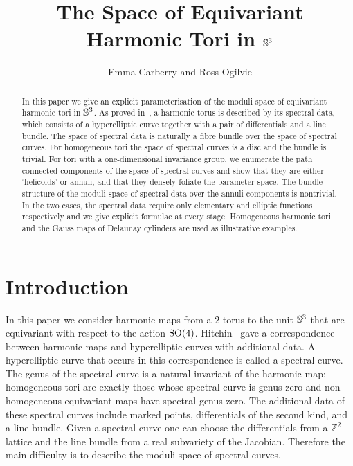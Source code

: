 \documentclass{article}
\begin{document}
\title{The Space of Equivariant Harmonic Tori in $\S^3$}
\author{Emma Carberry and Ross Ogilvie}
\maketitle

\begin{abstract}
In this paper we give an explicit parameterisation of the moduli space of equivariant harmonic tori in $\S^3$. 
As proved in~\cite{Hitchin1990}, a harmonic torus is described by its spectral data, which consists of a hyperelliptic curve together with a pair of differentials and a line bundle. The space of spectral data is naturally a fibre bundle over the space of spectral curves.
For homogeneous tori the space of spectral curves is a disc and the bundle is trivial.
For tori with a one-dimensional invariance group, we enumerate the path connected components of the space of spectral curves and show that they are either `helicoids' or annuli, and that they densely foliate the parameter space. The bundle structure of the moduli space of spectral data over the annuli components is nontrivial.
In the two cases, the spectral data require only elementary and elliptic functions respectively and we give explicit formulae at every stage.
Homogeneous harmonic tori and the Gauss maps of Delaunay cylinders are used as illustrative examples.
\end{abstract}

\section{Introduction}\label{sec:Introduction}

In this paper we consider harmonic maps from a $2$-torus to the unit $\S^3$ that are equivariant with respect to the action $\SO(4)$.
Hitchin~\cite{Hitchin1990} gave a correspondence between harmonic maps and hyperelliptic curves with additional data. A hyperelliptic curve that occurs in this correspondence is called a spectral curve. 
The genus of the spectral curve is a natural invariant of the harmonic map; homogeneous tori are exactly those whose spectral curve is genus zero and non-homogeneous equivariant maps have spectral genus zero.
The additional data of these spectral curves include marked points, differentials of the second kind, and a line bundle. 
Given a spectral curve one can choose the differentials from a $\mathbb{Z}^2$ lattice and the line bundle from a real subvariety of the Jacobian. Therefore the main difficulty is to describe the moduli space of spectral curves.
\end{document}
